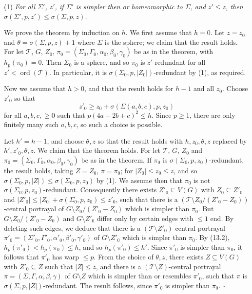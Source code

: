 \hspace*{12pt}(1) \textit{For all $\Sigma'$, $z'$, if $\Sigma'$ is simpler then or homeomorphic to $\Sigma$, and $z' \le z$, then $\sigma(\Sigma', p, z') \le \sigma(\Sigma, p, z)$.}

We prove the theorem by induction on $h$. We first assume that $h = 0$. Let $z = z_0$ and $\theta = \sigma(\Sigma, p, z) + 1$ where $\Sigma$ is the sphere; we claim that the result holds. For let $\mathscr{T}$, $G$, $Z_0$, $\pi_0 = (\Sigma_0, \Gamma_0, \alpha_0, \beta_0, \gamma_0)$ be as in the theorem, with $h_p(\pi_0) = 0$. Then $\Sigma_0$ is a sphere, and so $\pi_0$ is $z'$-redundant for all $z' < \operatorname{ord}(\mathscr{T})$. In particular, it is $\sigma(\Sigma_0, p, |Z_0|)$-redundant by (1), as required.

Now we assume that $h > 0$, and that the result holds for $h - 1$ and all $z_0$. Choose $z'_0$ so that
\begin{equation*}
z'_0 \ge z_0 + \sigma(\Sigma(a, b, c), p, z_0)
\end{equation*}
for all $a, b, c, \ge 0$ such that $p(4a + 2b + c)^2 \le h$. Since $p \ge 1$, there are only finitely many such $a, b, c$, so such a choice is possible.

Let $h' = h - 1$, and choose $\theta, z$ so that the result holds with $h, z_0, \theta, z$ replaced by $h', z'_0, \theta, z$. We claim that the theorem holds. For let $\mathscr{T}$, $G$, $Z_0$ and $\pi_0 = (\Sigma_0, \Gamma_0, \alpha_0, \beta_0, \gamma_0)$ be as in the theorem. If $\pi_0$ is $\sigma(\Sigma_0, p, z_0)$-redundant, the result holds, taking $Z = Z_0$, $\pi = \pi_0$; for $|Z_0| \le z_0 \le z$, and so $\sigma(\Sigma_0, p, |Z|) \le \sigma(\Sigma_0, p, z_0)$ by (1). We assume then that $\pi_0$ is not $\sigma(\Sigma_0, p, z_0)$-redundant. Consequently there exists $Z'_0 \subseteq V(G)$ with $Z_0 \subseteq Z'_0$ and $|Z'_0| \le |Z_0| + \sigma(\Sigma_0, p, z_0) \le z'_0$, such that there is a $(\mathscr{T} \setminus Z_0 / (Z'_0 - Z_0))$-central portrayal of $G \setminus Z_0 / (Z'_0 - Z_0)$ which is simpler than $\pi_0$. But $G \setminus Z_0 / (Z'_0 - Z_0)$ and $G \setminus Z'_0$ differ only by certain edges with $\le 1$ end. By deleting such edges, we deduce that there is a $(\mathscr{T} \setminus Z'_0)$-central portrayal $\pi'_0 = (\Sigma'_0, \Gamma'_0, \alpha'_0, \beta'_0, \gamma'_0)$ of $G \setminus Z'_0$ which is simpler than $\pi_0$. By (13.2), $h_p(\pi'_0) < h_p(\pi_0) \le h$, and so $h_p(\pi'_0) \le h'$. Since $\pi'_0$ is simpler than $\pi_0$, it follows that $\pi'_0$ has warp $\le p$. From the choice of $\theta, z$, there exists $Z \subseteq V(G)$ with $Z'_0 \subseteq Z$ such that $|Z| \le z$, and there is a $(\mathscr{T} \setminus Z)$-central portrayal $\pi = (\Sigma, \Gamma, \alpha, \beta, \gamma)$ of $G \setminus Z$ which is simpler than or resembles $\pi'_0$, such that $\pi$ is $\sigma(\Sigma, p, |Z|)$-redundant. The result follows, since $\pi'_0$ is simpler than $\pi_0$. $\square$

